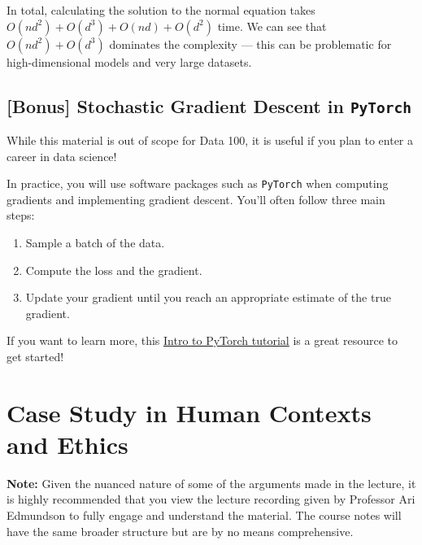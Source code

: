 \documentclass[
  letterpaper,
  DIV=11,
  numbers=noendperiod]{scrreprt}
\providecommand{\tightlist}{%
  \setlength{\itemsep}{0pt}\setlength{\parskip}{0pt}}\usepackage{longtable,booktabs,array}
\begin{document}
In total, calculating the solution to the normal equation takes
\(O(nd^2) + O(d^3) + O(nd) + O(d^2)\) time. We can see that
\(O(nd^2) + O(d^3)\) dominates the complexity --- this can be
problematic for high-dimensional models and very large datasets.

\section{\texorpdfstring{{[}Bonus{]} Stochastic Gradient Descent in
\texttt{PyTorch}}{{[}Bonus{]} Stochastic Gradient Descent in PyTorch}}\label{bonus-stochastic-gradient-descent-in-pytorch}

While this material is out of scope for Data 100, it is useful if you
plan to enter a career in data science!

In practice, you will use software packages such as \texttt{PyTorch}
when computing gradients and implementing gradient descent. You'll often
follow three main steps:

\begin{enumerate}
\def\labelenumi{\arabic{enumi}.}
\tightlist
\item
  Sample a batch of the data.
\item
  Compute the loss and the gradient.
\item
  Update your gradient until you reach an appropriate estimate of the
  true gradient.
\end{enumerate}

If you want to learn more, this
\href{https://pytorch.org/tutorials/beginner/deep_learning_60min_blitz.html}{Intro
to PyTorch tutorial} is a great resource to get started!


\chapter{Case Study in Human Contexts and
Ethics}\label{case-study-in-human-contexts-and-ethics}

\textbf{Note:} Given the nuanced nature of some of the arguments made in
the lecture, it is highly recommended that you view the lecture
recording given by Professor Ari Edmundson to fully engage and
understand the material. The course notes will have the same broader
structure but are by no means comprehensive.
\end{document}
